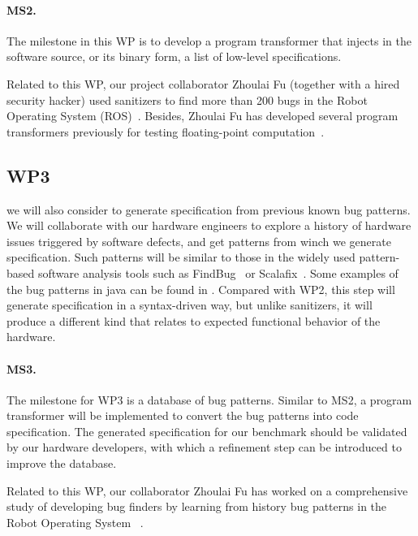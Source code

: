 \documentclass[fleqn,12pt]{article}
\begin{document}
\paragraph{MS2.} The milestone in this WP is to develop a program transformer
that injects in the software source, or its binary form, a list of
low-level specifications.

Related to this WP, our project collaborator Zhoulai Fu (together with
a hired security hacker) used sanitizers to find more than 200 bugs in
the Robot Operating System
(ROS)~\cite{web:ros-sanitizer-logs}. Besides, Zhoulai Fu has developed
several program transformers previously for testing floating-point
computation~\cite{DBLP:conf/pldi/FuS19,DBLP:conf/oopsla/FuBS15}.


\subsection{WP3}   we will also  consider to generate specification from  previous known bug patterns.  We will collaborate with our hardware engineers to explore a
history of hardware issues triggered by software defects, and get
patterns from winch we generate specification. Such patterns will be
similar to those in the widely used pattern-based software analysis
tools such as FindBug~\cite{DBLP:conf/paste/AyewahPMPZ07} or
Scalafix~\cite{web:scalafix}. Some examples of the bug patterns in
java can be found in \cite{web:findbugs_bugs}. Compared with WP2, this
step will  generate specification in a syntax-driven way, but
unlike sanitizers, it will produce a different kind that  relates
to expected functional behavior of the hardware.




\paragraph{MS3.} The milestone for WP3 is a database of bug patterns. Similar to MS2,
a program transformer will be implemented to convert the bug patterns
into code specification. The generated specification for our benchmark
should be validated by our hardware developers, with which a refinement
step can be introduced to improve the database.


Related to this WP, our collaborator Zhoulai Fu has worked on a comprehensive study of developing bug finders by learning from history bug patterns in the Robot Operating System~\cite{nielsenFSW2020dependencybugs} .
\end{document}
